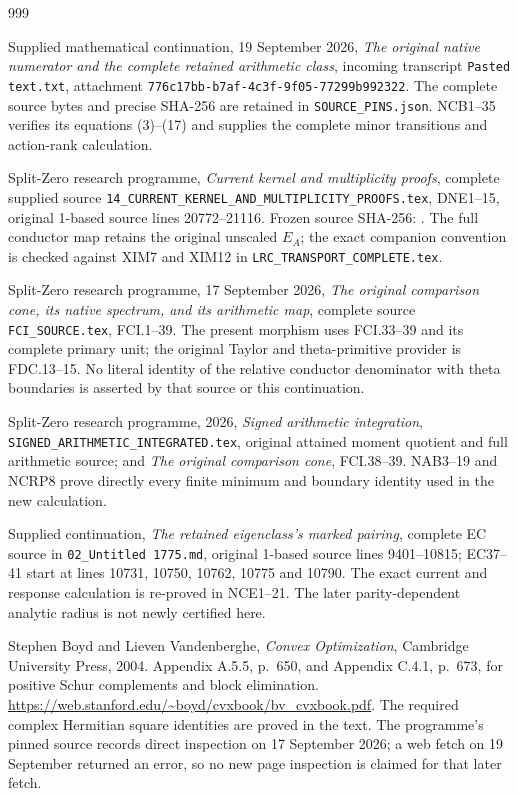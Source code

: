 \documentclass[11pt,a4paper]{article}
\begin{document}
\begin{thebibliography}{999}

Supplied mathematical continuation, 19 September 2026,
\emph{The original native numerator and the complete retained arithmetic class},
incoming transcript \texttt{Pasted text.txt}, attachment
\texttt{776c17bb-b7af-4c3f-9f05-77299b992322}.
The complete source bytes and precise SHA-256 are retained in
\texttt{SOURCE\_PINS.json}. NCB1--35 verifies its equations (3)--(17)
and supplies the complete minor transitions and action-rank calculation.

Split-Zero research programme, \emph{Current kernel and multiplicity proofs},
complete supplied source \texttt{14\_CURRENT\_KERNEL\_AND\_MULTIPLICITY\_PROOFS.tex},
DNE1--15, original 1-based source lines 20772--21116.
Frozen source SHA-256:
.
The full conductor map retains the original unscaled $E_A$;
the exact companion convention is checked against XIM7 and XIM12
in \texttt{LRC\_TRANSPORT\_COMPLETE.tex}.

Split-Zero research programme, 17 September 2026,
\emph{The original comparison cone, its native spectrum, and its arithmetic map},
complete source \texttt{FCI\_SOURCE.tex}, FCI.1--39.
The present morphism uses FCI.33--39 and its complete primary unit;
the original Taylor and theta-primitive provider is FDC.13--15.
No literal identity of the relative conductor denominator with theta
boundaries is asserted by that source or this continuation.

Split-Zero research programme, 2026,
\emph{Signed arithmetic integration},
\texttt{SIGNED\_ARITHMETIC\_INTEGRATED.tex}, original attained
moment quotient and full arithmetic source;
and \emph{The original comparison cone}, FCI.38--39.
NAB3--19 and NCRP8 prove directly every finite minimum and boundary
identity used in the new calculation.

Supplied continuation, \emph{The retained eigenclass's marked pairing},
complete EC source in \texttt{02\_Untitled 1775.md},
original 1-based source lines 9401--10815;
EC37--41 start at lines 10731, 10750, 10762, 10775 and 10790.
The exact current and response calculation is re-proved in NCE1--21.
The later parity-dependent analytic radius is not newly certified here.

Stephen Boyd and Lieven Vandenberghe,
\emph{Convex Optimization}, Cambridge University Press, 2004.
Appendix A.5.5, p.~650, and Appendix C.4.1, p.~673,
for positive Schur complements and block elimination.
\url{https://web.stanford.edu/~boyd/cvxbook/bv_cvxbook.pdf}.
The required complex Hermitian square identities are proved in the text.
The programme's pinned source records direct inspection on
17 September 2026; a web fetch on 19 September returned an error,
so no new page inspection is claimed for that later fetch.


\end{thebibliography}
\end{document}

